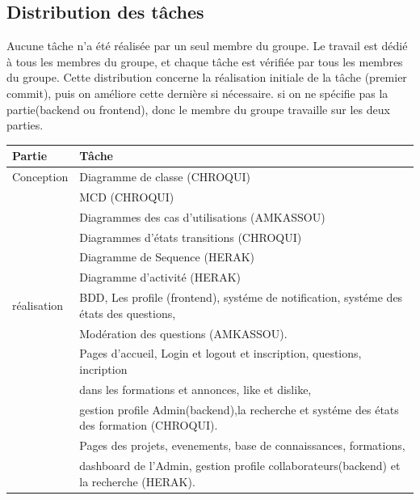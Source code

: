 \documentclass{article}
\begin{document}
        \subsection{Distribution des tâches}
            Aucune tâche n'a été réalisée par un seul membre du groupe. Le travail est dédié à tous les membres du groupe, 
            et chaque tâche est vérifiée par tous les membres du groupe.
            Cette distribution concerne la réalisation initiale de la tâche (premier commit), puis on améliore cette dernière si nécessaire.\newline
            si on ne spécifie pas la partie(backend ou frontend), donc le membre du groupe travaille sur les deux parties.\newline
            \begin{tabular}{|l|l|}
                \hline
                Partie &
                Tâche \\
                \hline
                Conception  &
                Diagramme de classe (CHROQUI) \\
                            &
                MCD (CHROQUI) \\
                            &
                Diagrammes des cas d'utilisations (AMKASSOU) \\
                            &
                Diagrammes d'états transitions (CHROQUI) \\
                            &
                Diagramme de Sequence (HERAK) \\
                            &
                Diagramme d'activité (HERAK) \\
                \hline
                réalisation &
                BDD, Les profile (frontend), systéme de notification, systéme des états des questions,\\
                            &
                Modération des questions (AMKASSOU). \\
                            &
                Pages d'accueil, Login et logout et inscription, questions, incription\\
                            &
                dans les formations et annonces, like et dislike,\\
                            &
                gestion profile Admin(backend),la recherche et systéme des états des formation (CHROQUI). \\
                            &
                Pages des projets, evenements, base de connaissances, formations,\\
                            &
                dashboard de l'Admin, gestion profile collaborateurs(backend) et la recherche (HERAK). \\
                \hline
            \end{tabular}
\end{document}
